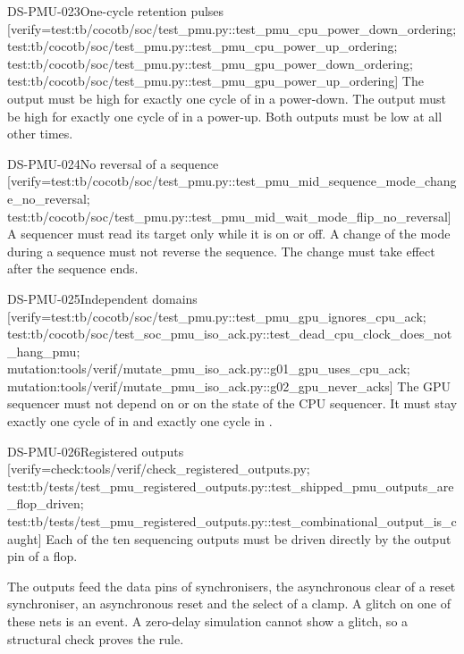\begin{requirement}{DS-PMU-023}{One-cycle retention pulses}
[verify={test:tb/cocotb/soc/test_pmu.py::test_pmu_cpu_power_down_ordering; test:tb/cocotb/soc/test_pmu.py::test_pmu_cpu_power_up_ordering; test:tb/cocotb/soc/test_pmu.py::test_pmu_gpu_power_down_ordering; test:tb/cocotb/soc/test_pmu.py::test_pmu_gpu_power_up_ordering}]
The output  must be high for exactly one cycle of  in a power-down. The output  must be high for exactly one cycle of  in a power-up. Both outputs must be low at all other times.
\end{requirement}

\begin{requirement}{DS-PMU-024}{No reversal of a sequence}
[verify={test:tb/cocotb/soc/test_pmu.py::test_pmu_mid_sequence_mode_change_no_reversal; test:tb/cocotb/soc/test_pmu.py::test_pmu_mid_wait_mode_flip_no_reversal}]
A sequencer must read its target only while it is on or off. A change of the mode during a sequence must not reverse the sequence. The change must take effect after the sequence ends.
\end{requirement}

\begin{requirement}{DS-PMU-025}{Independent domains}
[verify={test:tb/cocotb/soc/test_pmu.py::test_pmu_gpu_ignores_cpu_ack; test:tb/cocotb/soc/test_soc_pmu_iso_ack.py::test_dead_cpu_clock_does_not_hang_pmu; mutation:tools/verif/mutate_pmu_iso_ack.py::g01_gpu_uses_cpu_ack; mutation:tools/verif/mutate_pmu_iso_ack.py::g02_gpu_never_acks}]
The GPU sequencer must not depend on  or on the state of the CPU sequencer. It must stay exactly one cycle of  in  and exactly one cycle in .
\end{requirement}

\begin{requirement}{DS-PMU-026}{Registered outputs}
[verify={check:tools/verif/check_registered_outputs.py; test:tb/tests/test_pmu_registered_outputs.py::test_shipped_pmu_outputs_are_flop_driven; test:tb/tests/test_pmu_registered_outputs.py::test_combinational_output_is_caught}]
Each of the ten sequencing outputs must be driven directly by the output pin of a flop.
\end{requirement}
\begin{rationale}
The outputs feed the data pins of synchronisers, the asynchronous clear of a reset synchroniser, an asynchronous reset and the select of a clamp. A glitch on one of these nets is an event. A zero-delay simulation cannot show a glitch, so a structural check proves the rule.
\end{rationale}

